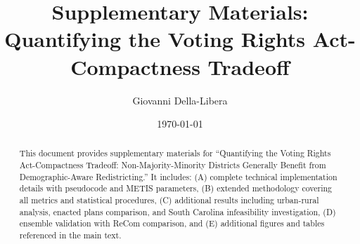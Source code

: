 \documentclass[12pt,letterpaper]{article}
\title{\textbf{Supplementary Materials:\\
Quantifying the Voting Rights Act-Compactness Tradeoff}}
\author{
    Giovanni Della-Libera
}
\date{\today}
\begin{document}
\maketitle

\begin{abstract}
This document provides supplementary materials for ``Quantifying the Voting Rights Act-Compactness Tradeoff: Non-Majority-Minority Districts Generally Benefit from Demographic-Aware Redistricting.'' It includes: (A) complete technical implementation details with pseudocode and METIS parameters, (B) extended methodology covering all metrics and statistical procedures, (C) additional results including urban-rural analysis, enacted plans comparison, and South Carolina infeasibility investigation, (D) ensemble validation with ReCom comparison, and (E) additional figures and tables referenced in the main text.
\end{abstract}

\singlespacing
\tableofcontents
\clearpage

\doublespacing

\appendix







\singlespacing

\end{document}
